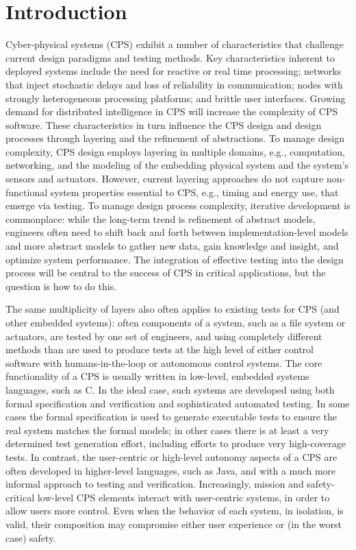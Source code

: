 \section{Introduction}

Cyber-physical systems (CPS) exhibit a number of characteristics that challenge current design paradigms and testing methods.  Key characteristics inherent to deployed systems include the need for reactive or real time processing; networks that inject stochastic delays and loss of reliability in communication; nodes with strongly heterogeneous processing platforms; and brittle user interfaces. Growing demand for distributed intelligence in CPS will increase the complexity of CPS software. These characteristics in turn influence the CPS design and design processes through layering and the refinement of abstractions. To manage design complexity, CPS design employs layering in multiple domains, e.g., computation, networking, and the modeling of the embedding physical system and the system's sensors and actuators. However, current layering approaches do not capture non-functional system properties essential to CPS, e.g., timing and energy use, that emerge via testing.  To manage design process complexity, iterative development is commonplace: while the long-term trend is refinement of abstract models, engineers often need to shift back and forth  between implementation-level models and more abstract models to gather new data, gain knowledge and insight, and optimize system performance.  The integration of effective testing into the design process will be central to the success of CPS in critical applications, but the question is how to do this.

The same multiplicity of layers also often applies to existing tests for CPS (and other embedded systems):  often components of a system, such as a file system or actuators, are tested by one set of engineers, and using completely different methods than are used to produce tests at the high level of either control software with humans-in-the-loop or autonomous control systems.  
The core functionality of a CPS is usually written in low-level, embedded
systems languages, such as C.  In the ideal case, such systems are developed using both
formal specification and verification and sophisticated automated
testing.  In some cases the formal specification is used to generate
executable tests to ensure the real system matches the formal models;
in other cases there is at least a very determined test generation
effort, including efforts to produce very high-coverage tests.  In
contrast, the user-centric or high-level autonomy aspects of a CPS are often developed in higher-level
languages, such as Java, and with a much more informal approach to
testing and verification.  Increasingly, mission and safety-critical low-level CPS elements
interact with user-centric systems, in order to allow users more
control.  Even when the behavior of each system, in isolation, is
valid, their composition may compromise either user experience or (in
the worst case) safety.

